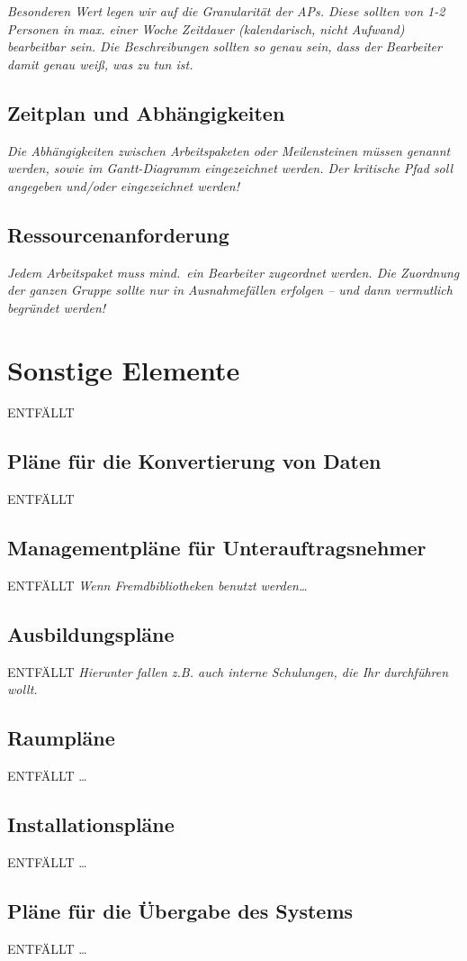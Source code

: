 \documentclass[fontsize=12pt,paper=a4,twoside]{scrartcl}
\begin{document}
{\em Besonderen Wert legen wir auf die Granularität der APs. Diese
  sollten von 1-2 Personen in max. einer Woche Zeitdauer (kalendarisch, nicht
  Aufwand) bearbeitbar sein. Die Beschreibungen sollten so genau sein,
  dass der Bearbeiter damit genau weiß, was zu tun ist.}

\subsection{Zeitplan und Abhängigkeiten}

{\em Die Abhängigkeiten zwischen Arbeitspaketen oder Meilensteinen müssen genannt werden, sowie im
  Gantt-Diagramm eingezeichnet werden. Der kritische Pfad soll
  angegeben und/oder eingezeichnet werden!}

\subsection{Ressourcenanforderung}

{\em Jedem Arbeitspaket muss mind.\ ein Bearbeiter zugeordnet
  werden. Die Zuordnung der ganzen Gruppe sollte nur in Ausnahmefällen
  erfolgen -- und dann vermutlich begründet werden!}


\section{Sonstige Elemente}
ENTFÄLLT
\subsection{Pläne für die Konvertierung von Daten}
ENTFÄLLT

\subsection{Managementpläne für Unterauftragsnehmer}
ENTFÄLLT
{\em Wenn Fremdbibliotheken benutzt werden\dots}

\subsection{Ausbildungspläne}
ENTFÄLLT
{\em Hierunter fallen z.B. auch interne Schulungen, die Ihr
  durchführen wollt.}

\subsection{Raumpläne}
ENTFÄLLT
\dots

\subsection{Installationspläne}
ENTFÄLLT
\dots

\subsection{Pläne für die Übergabe des Systems}
ENTFÄLLT
\dots
\end{document}
